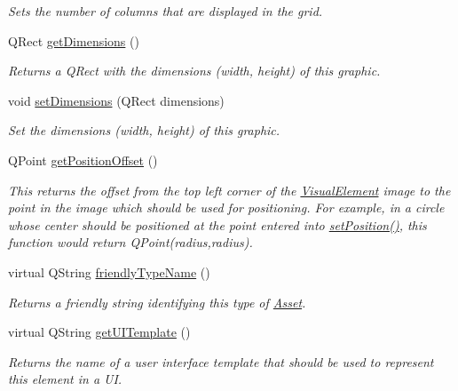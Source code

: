 \begin{DoxyCompactItemize}
\begin{DoxyCompactList}\small\item\em Sets the number of columns that are displayed in the grid. \end{DoxyCompactList}\item 
Q\-Rect \hyperlink{class_picto_1_1_grid_graphic_af9baeeac113b84c6885ea695d6a26ad7}{get\-Dimensions} ()
\begin{DoxyCompactList}\small\item\em Returns a Q\-Rect with the dimensions (width, height) of this graphic. \end{DoxyCompactList}\item 
void \hyperlink{class_picto_1_1_grid_graphic_a12010496ed91c552a5d931e362d52403}{set\-Dimensions} (Q\-Rect dimensions)
\begin{DoxyCompactList}\small\item\em Set the dimensions (width, height) of this graphic. \end{DoxyCompactList}\item 
\hypertarget{class_picto_1_1_grid_graphic_a55cc705ee5c5715834ee22d06209ad13}{Q\-Point \hyperlink{class_picto_1_1_grid_graphic_a55cc705ee5c5715834ee22d06209ad13}{get\-Position\-Offset} ()}\label{class_picto_1_1_grid_graphic_a55cc705ee5c5715834ee22d06209ad13}

\begin{DoxyCompactList}\small\item\em This returns the offset from the top left corner of the \hyperlink{struct_picto_1_1_visual_element}{Visual\-Element} image to the point in the image which should be used for positioning. For example, in a circle whose center should be positioned at the point entered into \hyperlink{struct_picto_1_1_visual_element_a454cc96862097e96a0b0f1d2c83e23ed}{set\-Position()}, this function would return Q\-Point(radius,radius). \end{DoxyCompactList}\item 
virtual Q\-String \hyperlink{class_picto_1_1_grid_graphic_a21a64033e378941162800c45d7cb5f24}{friendly\-Type\-Name} ()
\begin{DoxyCompactList}\small\item\em Returns a friendly string identifying this type of \hyperlink{class_picto_1_1_asset}{Asset}. \end{DoxyCompactList}\item 
\hypertarget{class_picto_1_1_grid_graphic_a5cf34bacee28cb0fdf127dc83584bf16}{virtual Q\-String \hyperlink{class_picto_1_1_grid_graphic_a5cf34bacee28cb0fdf127dc83584bf16}{get\-U\-I\-Template} ()}\label{class_picto_1_1_grid_graphic_a5cf34bacee28cb0fdf127dc83584bf16}

\begin{DoxyCompactList}\small\item\em Returns the name of a user interface template that should be used to represent this element in a U\-I. \end{DoxyCompactList}\end{DoxyCompactItemize}
